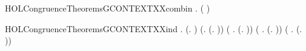 \newcommand{\HOLCongruenceTheoremsGCONTEXTXXcases}{\UseVerbatim{HOLCongruenceTheoremsGCONTEXTXXcases}}
\begin{SaveVerbatim}{HOLCongruenceTheoremsGCONTEXTXXcombin}
\HOLTokenTurnstile{} \HOLSymConst{\HOLTokenForall{}} .   \HOLSymConst{\HOLTokenConj{}}   \HOLSymConst{\HOLTokenImp{}}  ( \HOLConst{\HOLTokenCompose} )
\end{SaveVerbatim}
\newcommand{\HOLCongruenceTheoremsGCONTEXTXXcombin}{\UseVerbatim{HOLCongruenceTheoremsGCONTEXTXXcombin}}
\begin{SaveVerbatim}{HOLCongruenceTheoremsGCONTEXTXXind}
\HOLTokenTurnstile{} \HOLSymConst{\HOLTokenForall{}}.
        (\HOLTokenLambda{}. ) \HOLSymConst{\HOLTokenConj{}} (\HOLSymConst{\HOLTokenForall{}}.  (\HOLTokenLambda{}. )) \HOLSymConst{\HOLTokenConj{}}
       (\HOLSymConst{\HOLTokenForall{}} .   \HOLSymConst{\HOLTokenImp{}}  (\HOLTokenLambda{}.  )) \HOLSymConst{\HOLTokenConj{}}
       (\HOLSymConst{\HOLTokenForall{}}   .
              \HOLSymConst{\HOLTokenConj{}}   \HOLSymConst{\HOLTokenImp{}}
             (\HOLTokenLambda{}.   \HOLSymConst{+}  )) \HOLSymConst{\HOLTokenConj{}}
       (\HOLSymConst{\HOLTokenForall{}} .
              \HOLSymConst{\HOLTokenConj{}}   \HOLSymConst{\HOLTokenImp{}}
             (\HOLTokenLambda{}.   \HOLSymConst{\ensuremath{\parallel}}  )) \HOLSymConst{\HOLTokenConj{}}

\end{SaveVerbatim}
